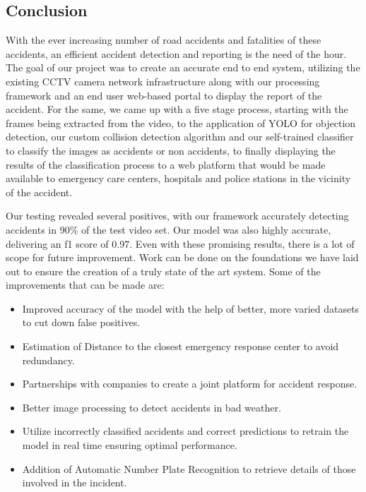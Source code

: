 \documentclass[ 12pt,a4paper,twocolumn,fleqn]{article}
\begin{document}
\begin{adjustwidth}{3.5em}{0pt}
\newpage
    \pagestyle{fancy}
    
\section{Conclusion}

With the ever increasing number of road accidents and fatalities of these accidents, an efficient accident detection and reporting is the need of the hour. The goal of our project was to create an accurate end to end system, utilizing the existing CCTV camera network infrastructure along with our processing framework and an end user web-based portal to display the report of the accident. For the same, we came up with a five stage process, starting with the frames being extracted from the video, to the application of YOLO for objection detection, our custom collision detection algorithm and our self-trained classifier to classify the images as accidents or non accidents, to finally displaying the results of the classification process to a web platform that would be made available to emergency care centers, hospitals and police stations in the vicinity of the accident.

\hspace{0.2cm}


Our testing revealed several positives, with our framework accurately detecting accidents in 90\% of the test video set. Our model was also highly accurate, delivering an f1 score of 0.97.
Even with these promising results, there is a lot of scope for future improvement. Work can be done on the foundations we have laid out to ensure the creation of a truly state of the art system. Some of the improvements that can be made are:

\begin{itemize}
    \item Improved accuracy of the model with the help of better, more varied datasets to cut down false positives.
    \item Estimation of Distance to the closest emergency response center to avoid redundancy.
    \item Partnerships with companies to create a joint platform for accident response.
    \item Better image processing to detect accidents in bad weather.
    \item Utilize incorrectly classified accidents and correct predictions to retrain the model in real time ensuring optimal performance.
    \item Addition of Automatic Number Plate Recognition to retrieve details of those involved in the incident.
\end{itemize}


\end{adjustwidth}
\end{document}
